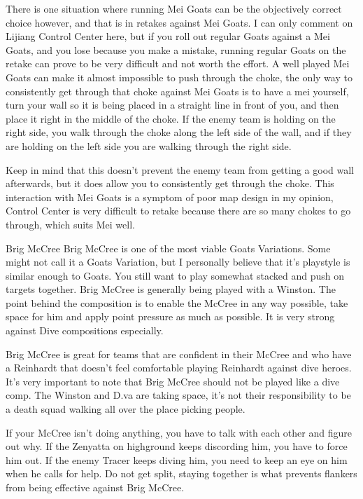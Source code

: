 There is one situation where running Mei Goats can be the objectively correct choice however, and that is in retakes against Mei Goats. I can only comment on Lijiang Control Center here, but if you roll out regular Goats against a Mei Goats, and you lose because you make a mistake, running regular Goats on the retake can prove to be very difficult and not worth the effort. A well played Mei Goats can make it almost impossible to push through the choke, the only way to consistently get through that choke against Mei Goats is to have a mei yourself, turn your wall so it is being placed in a straight line in front of you, and then place it right in the middle of the choke. If the enemy team is holding on the right side, you walk through the choke along the left side of the wall, and if they are holding on the left side you are walking through the right side.



Keep in mind that this doesn’t prevent the enemy team from getting a good wall afterwards, but it does allow you to consistently get through the choke. This interaction with Mei Goats is a symptom of poor map design in my opinion, Control Center is very difficult to retake because there are so many chokes to go through, which suits Mei well. 

Brig McCree
Brig McCree is one of the most viable Goats Variations. Some might not call it a Goats Variation, but I personally believe that it’s playstyle is similar enough to Goats. You still want to play somewhat stacked and push on targets together. Brig McCree is generally being played with a Winston. The point behind the composition is to enable the McCree in any way possible, take space for him and apply point pressure as much as possible. It is very strong against Dive compositions especially. 

Brig McCree is great for teams that are confident in their McCree and who have a Reinhardt that doesn’t feel comfortable playing Reinhardt against dive heroes. It’s very important to note that Brig McCree should not be played like a dive comp. The Winston and D.va are taking space, it’s not their responsibility to be a death squad walking all over the place picking people.

If your McCree isn’t doing anything, you have to talk with each other and figure out why. If the Zenyatta on highground keeps discording him, you have to force him out. If the enemy Tracer keeps diving him, you need to keep an eye on him when he calls for help. Do not get split, staying together is what prevents flankers from being effective against Brig McCree.

